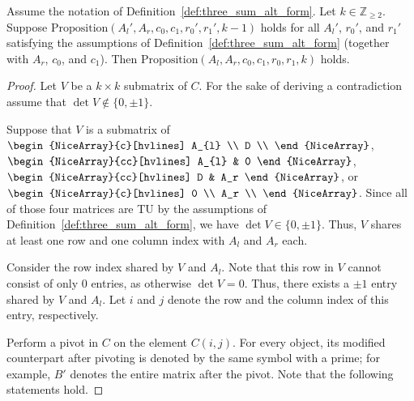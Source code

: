 \begin{lemma}\label{lem:three_sum_alt_form_k_TU_induction}
    Assume the notation of Definition~\ref{def:three_sum_alt_form}. Let $k \in \mathbb{Z}_{\geq 2}$. Suppose $\mathrm{Proposition}(A_{l}', A_{r}, c_{0}, c_{1}, r_{0}', r_{1}', k - 1)$ holds for all $A_{l}'$, $r_{0}'$, and $r_{1}'$ satisfying the assumptions of Definition~\ref{def:three_sum_alt_form} (together with $A_{r}$, $c_{0}$, and $c_{1}$). Then $\mathrm{Proposition}(A_{l}, A_{r}, c_{0}, c_{1}, r_{0}, r_{1}, k)$ holds.
\end{lemma}

\begin{proof}
    Let $V$ be a $k \times k$ submatrix of $C$. For the sake of deriving a contradiction assume that $\det V \notin \{0, \pm 1\}$.

    Suppose that $V$ is a submatrix of $\begin{NiceArray}{c}[hvlines] A_{l} \\ D \\ \end{NiceArray}$, $\begin{NiceArray}{cc}[hvlines] A_{l} & 0 \end{NiceArray}$, $\begin{NiceArray}{cc}[hvlines] D & A_r \end{NiceArray}$, or $\begin{NiceArray}{c}[hvlines] 0 \\ A_r \\ \end{NiceArray}$. Since all of those four matrices are TU by the assumptions of Definition~\ref{def:three_sum_alt_form}, we have $\det V \in \{0, \pm 1\}$. Thus, $V$ shares at least one row and one column index with $A_{l}$ and $A_{r}$ each.

    Consider the row index shared by $V$ and $A_{l}$. Note that this row in $V$ cannot consist of only $0$ entries, as otherwise $\det V = 0$. Thus, there exists a $\pm 1$ entry shared by $V$ and $A_{l}$. Let $i$ and $j$ denote the row and the column index of this entry, respectively.

    Perform a pivot in $C$ on the element $C (i, j)$. For every object, its modified counterpart after pivoting is denoted by the same symbol with a prime; for example, $B'$ denotes the entire matrix after the pivot. Note that the following statements hold.


\end{proof}

